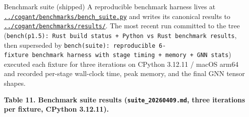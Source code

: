 \documentclass[
  ignorenonframetext,
]{beamer}
\begin{document}
\begin{frame}[fragile]{Benchmark suite (shipped)}
\protect{}\label{benchmark-suite-shipped}
A reproducible benchmark harness lives at
\href{../cogant/benchmarks/bench_suite.py}{\texttt{../cogant/benchmarks/bench\_suite.py}}
and writes its canonical results to
\href{../cogant/benchmarks/results/}{\texttt{../cogant/benchmarks/results/}}.
The most recent run committed to the tree
(\texttt{bench(p1.5):\ Rust\ build\ status\ +\ Python\ vs\ Rust\ benchmark\ results},
then superseded by
\texttt{bench(suite):\ reproducible\ 6-fixture\ benchmark\ harness\ with\ stage\ timing\ +\ memory\ +\ GNN\ stats})
executed each fixture for three iterations on CPython 3.12.11 / macOS
arm64 and recorded per-stage wall-clock time, peak memory, and the final
GNN tensor shapes.

\textbf{Table 11. Benchmark suite results (\texttt{suite\_20260409.md},
three iterations per fixture, CPython 3.12.11).}


\end{frame}
\end{document}
